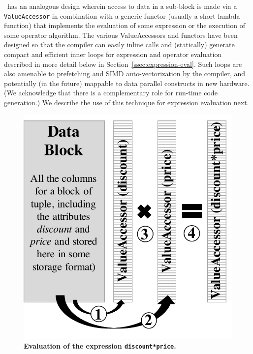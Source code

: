 \Quickstep\ has an analogous design wherein access to data in a sub-block is made via a \texttt{ValueAccessor} in combination with a generic functor (usually a short lambda function) that implements the evaluation of some expression or the execution of some operator algorithm. The various ValueAccessors and functors have been designed so that the compiler can easily inline calls and (statically) generate compact and efficient inner loops for expression and operator evaluation described in more detail below in Section~\ref{ssec:expression-eval}. Such loops are also amenable to prefetching and SIMD auto-vectorization by the compiler, and potentially (in the future) mappable to data parallel constructs in new hardware. (We acknowledge that there is a complementary role for run-time code generation.) We describe the use of this technique for expression evaluation next.


\begin{figure}
\centering
   \includegraphics[width=0.25\textheight]{system/figures/VA.pdf}
   \caption{\textbf{Evaluation of the expression \texttt{discount*price}.}}
   \label{fig-template-VA}
\end{figure}


